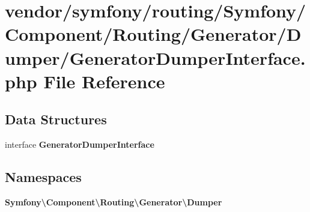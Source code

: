 \section{vendor/symfony/routing/\+Symfony/\+Component/\+Routing/\+Generator/\+Dumper/\+Generator\+Dumper\+Interface.php File Reference}
\label{_generator_dumper_interface_8php}
\subsection*{Data Structures}
\begin{DoxyCompactItemize}
\item 
interface {\bf Generator\+Dumper\+Interface}
\end{DoxyCompactItemize}
\subsection*{Namespaces}
\begin{DoxyCompactItemize}
\item 
 {\bf Symfony\textbackslash{}\+Component\textbackslash{}\+Routing\textbackslash{}\+Generator\textbackslash{}\+Dumper}
\end{DoxyCompactItemize}
